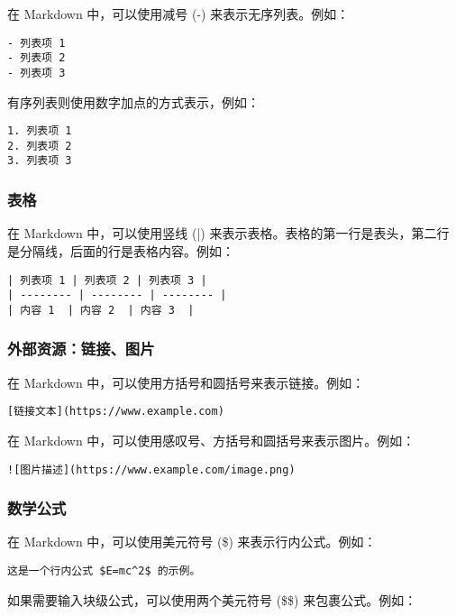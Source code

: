 \documentclass[../main.tex]{subfiles}
\begin{document}
在 Markdown 中，可以使用减号 (-) 来表示无序列表。例如：

\begin{lstlisting}
- 列表项 1
- 列表项 2
- 列表项 3
\end{lstlisting}

有序列表则使用数字加点的方式表示，例如：

\begin{lstlisting}
1. 列表项 1
2. 列表项 2
3. 列表项 3
\end{lstlisting}

\subsubsection{表格}

在 Markdown 中，可以使用竖线 (|) 来表示表格。表格的第一行是表头，第二行是分隔线，后面的行是表格内容。例如：

\begin{lstlisting}
| 列表项 1 | 列表项 2 | 列表项 3 |
| -------- | -------- | -------- |
| 内容 1  | 内容 2  | 内容 3  |
\end{lstlisting}

\subsubsection{外部资源：链接、图片}

在 Markdown 中，可以使用方括号和圆括号来表示链接。例如：

\begin{lstlisting}
[链接文本](https://www.example.com)
\end{lstlisting}

在 Markdown 中，可以使用感叹号、方括号和圆括号来表示图片。例如：

\begin{lstlisting}
![图片描述](https://www.example.com/image.png)
\end{lstlisting}

\subsubsection{数学公式}

在 Markdown 中，可以使用美元符号 (\$) 来表示行内公式。例如：

\begin{lstlisting}
这是一个行内公式 $E=mc^2$ 的示例。
\end{lstlisting}

如果需要输入块级公式，可以使用两个美元符号 (\$\$) 来包裹公式。例如：
\end{document}
